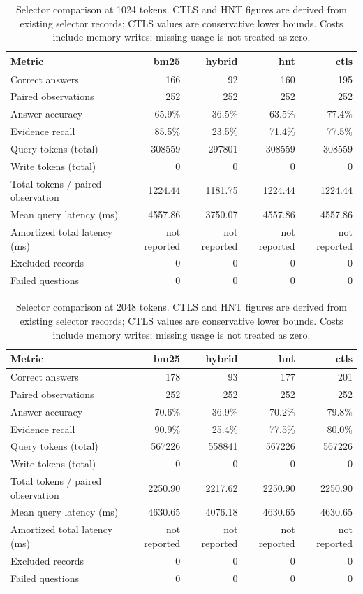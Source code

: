\begin{table}[htbp]
\centering
\small
\caption{Selector comparison at 1024 tokens. CTLS and HNT figures are derived from existing selector records; CTLS values are conservative lower bounds. Costs include memory writes; missing usage is not treated as zero.}
\label{tab:fair_baselines}
\begin{tabular}{lrrrr}
\toprule
Metric & bm25 & hybrid & hnt & ctls \\
\midrule
Correct answers & 166 & 92 & 160 & 195 \\
Paired observations & 252 & 252 & 252 & 252 \\
Answer accuracy & 65.9\% & 36.5\% & 63.5\% & 77.4\% \\
Evidence recall & 85.5\% & 23.5\% & 71.4\% & 77.5\% \\
Query tokens (total) & 308559 & 297801 & 308559 & 308559 \\
Write tokens (total) & 0 & 0 & 0 & 0 \\
Total tokens / paired observation & 1224.44 & 1181.75 & 1224.44 & 1224.44 \\
Mean query latency (ms) & 4557.86 & 3750.07 & 4557.86 & 4557.86 \\
Amortized total latency (ms) & not reported & not reported & not reported & not reported \\
Excluded records & 0 & 0 & 0 & 0 \\
Failed questions & 0 & 0 & 0 & 0 \\
\bottomrule
\end{tabular}
\end{table}

\begin{table}[htbp]
\centering
\small
\caption{Selector comparison at 2048 tokens. CTLS and HNT figures are derived from existing selector records; CTLS values are conservative lower bounds. Costs include memory writes; missing usage is not treated as zero.}
\label{tab:protocol_replication}
\begin{tabular}{lrrrr}
\toprule
Metric & bm25 & hybrid & hnt & ctls \\
\midrule
Correct answers & 178 & 93 & 177 & 201 \\
Paired observations & 252 & 252 & 252 & 252 \\
Answer accuracy & 70.6\% & 36.9\% & 70.2\% & 79.8\% \\
Evidence recall & 90.9\% & 25.4\% & 77.5\% & 80.0\% \\
Query tokens (total) & 567226 & 558841 & 567226 & 567226 \\
Write tokens (total) & 0 & 0 & 0 & 0 \\
Total tokens / paired observation & 2250.90 & 2217.62 & 2250.90 & 2250.90 \\
Mean query latency (ms) & 4630.65 & 4076.18 & 4630.65 & 4630.65 \\
Amortized total latency (ms) & not reported & not reported & not reported & not reported \\
Excluded records & 0 & 0 & 0 & 0 \\
Failed questions & 0 & 0 & 0 & 0 \\
\bottomrule
\end{tabular}
\end{table}

